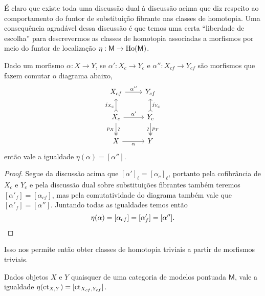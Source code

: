 É claro que existe toda uma discussão dual à discussão acima que diz respeito ao comportamento do funtor de substituição fibrante nas classes de homotopia.
Uma consequência agradável dessa discussão é que temos uma certa ``liberdade de escolha'' para descrevermos as classes de homotopia associadas a morfismos por meio do funtor de localização $\eta: \mathsf{M} \to \mathrm{Ho}(\mathsf{M})$.

\begin{prop}
  Dado um morfismo $\alpha: X \to Y$, se $\alpha': X_{c} \to Y_{c}$ e $\alpha'': X_{cf} \to Y_{cf}$ são morfismos que fazem comutar o diagrama abaixo,
  \begin{displaymath}
    \begin{tikzcd}
      X_{cf}
      \arrow[r, "\alpha''"]
      & Y_{cf}
      \\ X_{c}
      \arrow[r, "\alpha'"]
      \arrow[u, tail, "j_{X_{c}}"]
      \arrow[d, two heads, "\sim" {sloped}, "p_{X}" {swap}]
      & Y_{c}
      \arrow[u, tail, "j_{Y_{c}}" {swap}]
      \arrow[d, two heads, "p_{Y}", "\sim" {swap,sloped}]
      \\ X
      \arrow[r, "\alpha" swap]
      & Y
    \end{tikzcd}
  \end{displaymath}
  então vale a igualdade $\eta(\alpha) = [\alpha'']$.
\end{prop}

\begin{proof}
  Segue da discussão acima que $[\alpha']_{\ell} = [\alpha_{c}]_{\ell}$, portanto pela cofibrância de $X_{c}$ e $Y_{c}$ e pela discussão dual sobre substituições fibrantes também teremos $[\alpha'_{f}] = [\alpha_{cf}]$, mas pela comutatividade do diagrama também vale que $[\alpha'_{f}] = [\alpha'']$.
  Juntando todas as igualdades temos então
  \begin{displaymath}
    \eta(\alpha) = [\alpha_{cf}] = [\alpha'_{f}] = [\alpha'']. \qedhere
  \end{displaymath}
\end{proof}

Isso nos permite então obter classes de homotopia triviais a partir de morfismos triviais.

\begin{corol}\label{corol:classe_de_homotopia_morfismo_constante}
  Dados objetos $X$ e $Y$ quaisquer de uma categoria de modelos pontuada $\mathsf{M}$, vale a igualdade $\eta(\mathrm{ct}_{X,Y}) = [\mathrm{ct}_{X_{cf},Y_{cf}}]$.
\end{corol}

